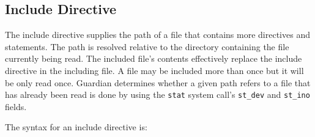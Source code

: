 
\subsection{Include Directive}
{
	The include directive supplies the path of a file that
	contains more directives and statements.
	The path is resolved
	relative to the directory containing the file currently being read.
	The included file's contents effectively
	replace the include directive in the including file.
	A file may be included more than once but it will be only read once.
	Guardian determines whether a given path refers to a file that has
	already been read is done by using the \texttt{stat} system
	call's \texttt{st\_dev} and \texttt{st\_ino} fields.
	
	The syntax for an include directive is:
	\begin{lstlisting}[numbers = none, texcl = true, language = MAIA]
%include: "path/to/file.guard";
	\end{lstlisting}
}
